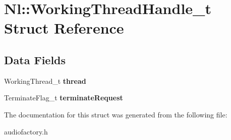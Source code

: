 \hypertarget{structNl_1_1WorkingThreadHandle__t}{}\section{Nl\+:\+:Working\+Thread\+Handle\+\_\+t Struct Reference}
\label{structNl_1_1WorkingThreadHandle__t}
\subsection*{Data Fields}
\begin{DoxyCompactItemize}
\item 
\hypertarget{structNl_1_1WorkingThreadHandle__t_ab1f22469db0bb1391783c47337c59e52}{}Working\+Thread\+\_\+t {\bfseries thread}\label{structNl_1_1WorkingThreadHandle__t_ab1f22469db0bb1391783c47337c59e52}

\item 
\hypertarget{structNl_1_1WorkingThreadHandle__t_a81f3b1ee1e85cec2403ca22178716a82}{}Terminate\+Flag\+\_\+t {\bfseries terminate\+Request}\label{structNl_1_1WorkingThreadHandle__t_a81f3b1ee1e85cec2403ca22178716a82}

\end{DoxyCompactItemize}


The documentation for this struct was generated from the following file\+:\begin{DoxyCompactItemize}
\item 
audiofactory.\+h\end{DoxyCompactItemize}
